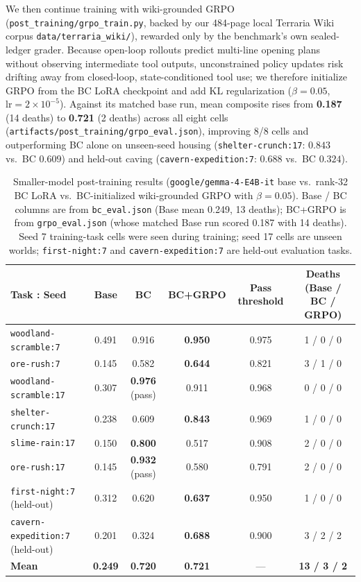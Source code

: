 \documentclass[10pt,letterpaper]{article}
\begin{document}
We then continue training with wiki-grounded GRPO (\texttt{post\_training/grpo\_train.py}, backed by our 484-page local Terraria Wiki corpus \texttt{data/terraria\_wiki/}), rewarded only by the benchmark's own sealed-ledger grader. Because open-loop rollouts predict multi-line opening plans without observing intermediate tool outputs, unconstrained policy updates risk drifting away from closed-loop, state-conditioned tool use; we therefore initialize GRPO from the BC LoRA checkpoint and add KL regularization ($\beta = 0.05$, $\text{lr} = 2\times 10^{-5}$). Against its matched base run, mean composite rises from \textbf{0.187} (14 deaths) to \textbf{0.721} (2 deaths) across all eight cells (\texttt{artifacts/post\_training/grpo\_eval.json}), improving 8/8 cells and outperforming BC alone on unseen-seed housing (\texttt{shelter-crunch:17}: $0.843$ vs.\ BC $0.609$) and held-out caving (\texttt{cavern-expedition:7}: $0.688$ vs.\ BC $0.324$).

\begin{table}[t]
\centering
\caption{Smaller-model post-training results (\texttt{google/gemma-4-E4B-it} base vs.\ rank-32 BC LoRA vs.\ BC-initialized wiki-grounded GRPO with $\beta=0.05$). Base / BC columns are from \texttt{bc\_eval.json} (Base mean 0.249, 13 deaths); BC+GRPO is from \texttt{grpo\_eval.json} (whose matched Base run scored 0.187 with 14 deaths). Seed 7 training-task cells were seen during training; seed 17 cells are unseen worlds; \texttt{first-night:7} and \texttt{cavern-expedition:7} are held-out evaluation tasks.}
\label{tab:posttraining}
\begin{tabular}{lccccc}
\toprule
Task : Seed & Base & BC & BC+GRPO & Pass threshold & Deaths (Base / BC / GRPO) \\
\midrule
\texttt{woodland-scramble:7} & 0.491 & 0.916 & \textbf{0.950} & 0.975 & 1 / 0 / 0 \\
\texttt{ore-rush:7} & 0.145 & 0.582 & \textbf{0.644} & 0.821 & 3 / 1 / 0 \\
\texttt{woodland-scramble:17} & 0.307 & \textbf{0.976} (pass) & 0.911 & 0.968 & 0 / 0 / 0 \\
\texttt{shelter-crunch:17} & 0.238 & 0.609 & \textbf{0.843} & 0.969 & 1 / 0 / 0 \\
\texttt{slime-rain:17} & 0.150 & \textbf{0.800} & 0.517 & 0.908 & 2 / 0 / 0 \\
\texttt{ore-rush:17} & 0.145 & \textbf{0.932} (pass) & 0.580 & 0.791 & 2 / 0 / 0 \\
\texttt{first-night:7} (held-out) & 0.312 & 0.620 & \textbf{0.637} & 0.950 & 1 / 0 / 0 \\
\texttt{cavern-expedition:7} (held-out) & 0.201 & 0.324 & \textbf{0.688} & 0.900 & 3 / 2 / 2 \\
\midrule
\textbf{Mean} & \textbf{0.249} & \textbf{0.720} & \textbf{0.721} & --- & \textbf{13 / 3 / 2} \\
\bottomrule
\end{tabular}
\end{table}
\end{document}
